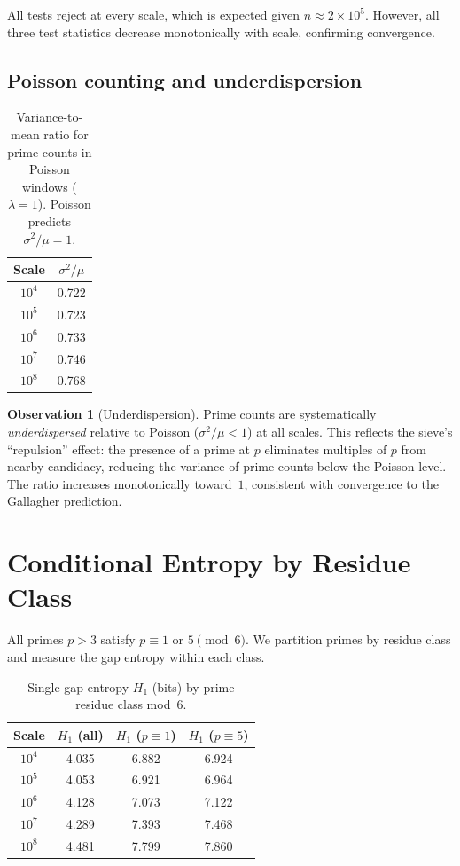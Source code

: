 \documentclass[11pt, a4paper]{amsart}
\theoremstyle{plain}
\theoremstyle{definition}
\newtheorem{observation}[theorem]{Observation}
\begin{document}
All tests reject at every scale, which is expected given $n \approx 2 \times 10^5$. However, all three test statistics decrease monotonically with scale, confirming convergence.

\subsection{Poisson counting and underdispersion}

\begin{table}[ht]
\centering
\caption{Variance-to-mean ratio for prime counts in Poisson windows ($\lambda = 1$). Poisson predicts $\sigma^2/\mu = 1$.}
\label{tab:poisson}
\begin{tabular}{cc}
\toprule
Scale & $\sigma^2 / \mu$ \\
\midrule
$10^4$ & 0.722 \\
$10^5$ & 0.723 \\
$10^6$ & 0.733 \\
$10^7$ & 0.746 \\
$10^8$ & 0.768 \\
\bottomrule
\end{tabular}
\end{table}

\begin{observation}[Underdispersion]
Prime counts are systematically \emph{underdispersed} relative to Poisson ($\sigma^2/\mu < 1$) at all scales.
This reflects the sieve's ``repulsion'' effect: the presence of a prime at $p$ eliminates multiples of $p$ from nearby candidacy, reducing the variance of prime counts below the Poisson level.
The ratio increases monotonically toward~$1$, consistent with convergence to the Gallagher prediction.
\end{observation}


\section{Conditional Entropy by Residue Class}
\label{sec:conditional}

All primes $p > 3$ satisfy $p \equiv 1$ or $5 \pmod{6}$. We partition primes by residue class and measure the gap entropy within each class.

\begin{table}[ht]
\centering
\caption{Single-gap entropy $H_1$ (bits) by prime residue class mod~$6$.}
\label{tab:cond-entropy}
\begin{tabular}{cccc}
\toprule
Scale & $H_1$ (all) & $H_1$ ($p \equiv 1$) & $H_1$ ($p \equiv 5$) \\
\midrule
$10^4$ & 4.035 & 6.882 & 6.924 \\
$10^5$ & 4.053 & 6.921 & 6.964 \\
$10^6$ & 4.128 & 7.073 & 7.122 \\
$10^7$ & 4.289 & 7.393 & 7.468 \\
$10^8$ & 4.481 & 7.799 & 7.860 \\
\bottomrule
\end{tabular}
\end{table}
\end{document}
